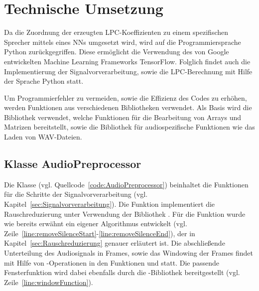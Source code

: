 \section{Technische Umsetzung}\label{sec:TechnischeUmsetzung}
Da die Zuordnung der erzeugten \ac{LPC}-Koeffizienten zu einem spezifischen Sprecher mittels eines \acp{NN} umgesetzt wird, wird auf die Programmiersprache Python zurückgegriffen.
Diese ermöglicht die Verwendung des von Google entwickelten Machine Learning Frameworks TensorFlow.
Folglich findet auch die Implementierung der Signalvorverarbeitung, sowie die \ac{LPC}-Berechnung mit Hilfe der Sprache Python statt.

Um Programmierfehler zu vermeiden, sowie die Effizienz des Codes zu erhöhen, werden Funktionen aus verschiedenen Bibliotheken verwendet.
Als Basis wird die Bibliothek  verwendet, welche Funktionen für die Bearbeitung von Arrays und Matrizen bereitstellt, sowie die Bibliothek  für audiospezifische Funktionen wie das Laden von WAV-Dateien.

\subsection{Klasse AudioPreprocessor}
Die Klasse  (vgl. Quellcode~\ref{code:AudioPreprocessor}) beinhaltet die Funktionen für die Schritte der Signalvorverarbeitung (vgl. Kapitel~\ref{sec:Signalvorverarbeitung}).
Die Funktion  implementiert die Rauschreduzierung unter Verwendung der Bibliothek .
Für die Funktion  wurde wie bereits erwähnt ein eigener Algorithmus entwickelt (vgl. Zeile~\ref{line:removeSilenceStart}-\ref{line:removeSilenceEnd}), der in Kapitel~\ref{sec:Rauschreduzierung} genauer erläutert ist.
Die abschließende Unterteilung des Audiosignals in Frames, sowie das Windowing der Frames findet mit Hilfe von -Operationen in den Funktionen  und  statt.
Die passende Fensterfunktion wird dabei ebenfalls durch die  -Bibliothek bereitgestellt (vgl. Zeile~\ref{line:windowFunction}).

